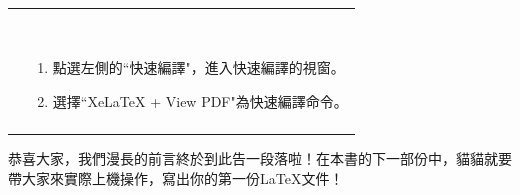 \documentclass{../indiv}
\begin{document}
\begin{table}[H]
\begin{tabular}{Z}
\begin{tabmp}[-0.2]
			\end{tabmp} &
			\begin{tabmp}\
				\begin{enumerate}[label=\texttt{(\arabic*)}, nosep, left=0pt, labelsep=0.5ex]
					\item 點選左側的``快速編譯"，進入快速編譯的視窗。
					\item 選擇``XeLaTeX + View PDF"為快速編譯命令。
				\end{enumerate}
			\end{tabmp}\\\Thline
		\end{tabular}
		\label{tab: Configure Texmaker}
	\end{table}
	\vspace{4mm}
	恭喜大家，我們漫長的前言終於到此告一段落啦！在本書的下一部份中，貓貓就要帶大家來實際上機操作，寫出你的第一份\LaTeX 文件！
\end{document}

